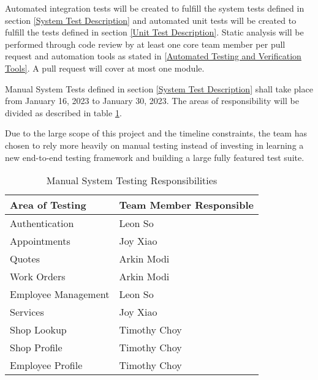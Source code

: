 \documentclass[12pt, titlepage]{article}
\begin{document}
Automated integration tests will be created to fulfill the system tests defined in section
\ref{System Test Description} and automated unit tests will be created to fulfill the tests defined
in section \ref{Unit Test Description}. Static analysis will be performed through code review by at
least one core team member per pull request and automation tools as stated in \ref{Automated
	Testing and Verification Tools}. A pull request will cover at most one module.

Manual System Tests defined in section \ref{System Test Description} shall take place from January
16, 2023 to January 30, 2023. The areas of responsibility will be divided as described in table
\ref{Manual System Testing Responsibilities}.

Due to the large scope of this project and the timeline constraints, the team has chosen to rely
more heavily on manual testing instead of investing in learning a new end-to-end testing framework
and building a large fully featured test suite.

\begin{table}[H]
	\centering
	\caption{Manual System Testing Responsibilities}
	\vspace{5pt}
	\begin{tabular}{|p{}|p{}|}
		\hline
		\textbf{Area of Testing} & \textbf{Team Member Responsible} \\
		\hline
		Authentication           & Leon So                          \\
		\hline
		Appointments             & Joy Xiao                         \\
		\hline
		Quotes                   & Arkin Modi                       \\
		\hline
		Work Orders              & Arkin Modi                       \\
		\hline
		Employee Management      & Leon So                          \\
		\hline
		Services                 & Joy Xiao                         \\
		\hline
		Shop Lookup              & Timothy Choy                     \\
		\hline
		Shop Profile             & Timothy Choy                     \\
		\hline
		Employee Profile         & Timothy Choy                     \\
		\hline
	\end{tabular}

	\label{Manual System Testing Responsibilities}
\end{table}
\end{document}
